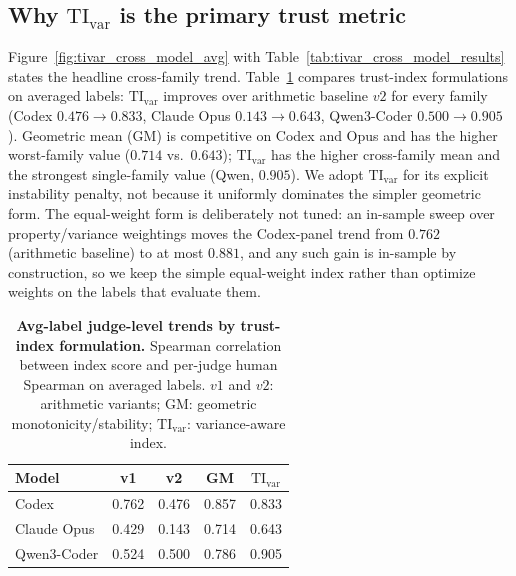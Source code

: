\documentclass{article}
\begin{document}
\subsection{Why \texorpdfstring{\(\mathrm{TI}_{\mathrm{var}}\)}{TI-var} is the primary trust metric}
Figure~\ref{fig:tivar_cross_model_avg} with Table~\ref{tab:tivar_cross_model_results} states the headline cross-family trend. Table~\ref{tab:cross_model_index_compare_avg} compares trust-index formulations on averaged labels: \(\mathrm{TI}_{\mathrm{var}}\) improves over arithmetic baseline \(v2\) for every family (Codex \(0.476\!\rightarrow\!0.833\), Claude Opus \(0.143\!\rightarrow\!0.643\), Qwen3-Coder \(0.500\!\rightarrow\!0.905\)). Geometric mean (GM) is competitive on Codex and Opus and has the higher worst-family value (\(0.714\) vs.\ \(0.643\)); \(\mathrm{TI}_{\mathrm{var}}\) has the higher cross-family mean and the strongest single-family value (Qwen, \(0.905\)).
We adopt \(\mathrm{TI}_{\mathrm{var}}\) for its explicit instability penalty, not because it uniformly dominates the simpler geometric form.
The equal-weight form is deliberately not tuned: an in-sample sweep over property/variance weightings moves the Codex-panel trend from \(0.762\) (arithmetic baseline) to at most \(0.881\), and any such gain is in-sample by construction, so we keep the simple equal-weight index rather than optimize weights on the labels that evaluate them.

\begin{table}[t]
  \centering
  \small
  \begin{tabular}{lcccc}
    \toprule
    \textbf{Model} & \textbf{v1} & \textbf{v2} & \textbf{GM} & $\mathrm{TI}_{\mathrm{var}}$ \\
    \midrule
    Codex          & 0.762       & 0.476       & 0.857       & 0.833                        \\
    Claude Opus    & 0.429       & 0.143       & 0.714       & 0.643                        \\
    Qwen3-Coder    & 0.524       & 0.500       & 0.786       & 0.905                        \\
    \bottomrule
  \end{tabular}
  \caption{\textbf{Avg-label judge-level trends by trust-index formulation.}
  Spearman correlation between index score and per-judge human Spearman on averaged labels.
  \(v1\) and \(v2\): arithmetic variants; GM: geometric monotonicity/stability; \(\mathrm{TI}_{\mathrm{var}}\): variance-aware index.}
  \label{tab:cross_model_index_compare_avg}
\end{table}
\end{document}
